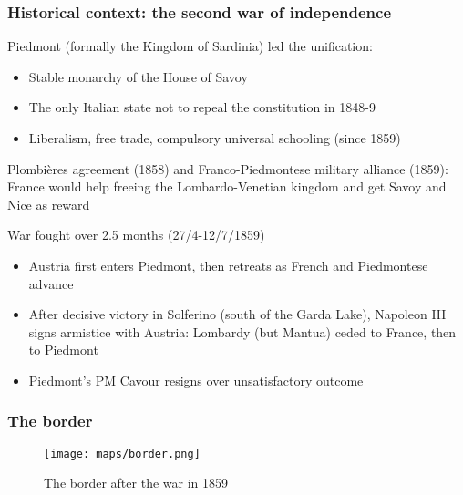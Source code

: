 \documentclass[10pt]{beamer}
\begin{document}
\begin{frame}
    \frametitle{Historical context: the second war of independence}
    
    Piedmont (formally the Kingdom of Sardinia) led the unification:
    \begin{itemize}
        \item Stable monarchy of the House of Savoy
        \item The only Italian state not to repeal the constitution in 1848-9
        \item Liberalism, free trade, compulsory universal schooling (since 1859)
    \end{itemize}

    \pause
    
    \bigskip

    Plombières agreement (1858) and Franco-Piedmontese military alliance (1859): France would help freeing the Lombardo-Venetian kingdom and get Savoy and Nice as reward

    \bigskip
    War fought over 2.5 months (27/4-12/7/1859)
    \begin{itemize}
        \item Austria first enters Piedmont, then retreats as French and Piedmontese advance
        \item After decisive victory in Solferino (south of the Garda Lake), Napoleon III signs armistice with Austria: Lombardy (but Mantua) ceded to France, then to Piedmont
        \item Piedmont's PM Cavour resigns over unsatisfactory outcome
    \end{itemize}
    
\end{frame}

\begin{frame}
    \frametitle{The border}

    \begin{figure}
        \centering
        \texttt{[image: maps/border.png]}
        \caption{The border after the war in 1859}
        \label{fig:border}
    \end{figure}

\end{frame}
\end{document}
